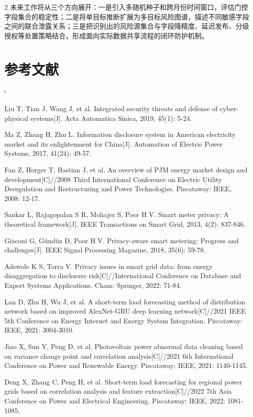 \documentclass[UTF8,zihao=5,twoside]{ctexart}
\makeatletter
\numberwithin{equation}{section}
\renewcommand{\refname}{参考文献}
\renewenvironment{thebibliography}[1]{%
  \section*{\refname}%
  \small
  \list{[\arabic{enumi}]}{%
    \settowidth\labelwidth{[#1]}%
    \leftmargin\labelwidth
    \advance\leftmargin\labelsep
    \usecounter{enumi}}
  \sloppy\clubpenalty4000\widowpenalty4000\sfcode`\.\@m
}{\def\@noitemerr{\@latex@warning{Empty `thebibliography' environment}}\endlist}
\makeatother
\begin{document}
\begin{multicols}{2}
未来工作将从三个方向展开：一是引入多随机种子和跨月份时间窗口，评估门控字段集合的稳定性；二是将单目标推断扩展为多目标风险图谱，描述不同敏感字段之间的联合泄露关系；三是把识别出的风险源集合与字段降精度、延迟发布、分级授权等处置策略结合，形成面向实际数据共享流程的闭环防护机制。

\balance
\begin{thebibliography}{99}
Liu T, Tian J, Wang J, et al. Integrated security threats and defense of cyber-physical systems[J]. Acta Automatica Sinica, 2019, 45(1): 5-24.

Ma Z, Zhang H, Zhu L. Information disclosure system in American electricity market and its enlightenment for China[J]. Automation of Electric Power Systems, 2017, 41(24): 49-57.

Fan Z, Horger T, Bastian J, et al. An overview of PJM energy market design and development[C]//2008 Third International Conference on Electric Utility Deregulation and Restructuring and Power Technologies. Piscataway: IEEE, 2008: 12-17.

Sankar L, Rajagopalan S R, Mohajer S, Poor H V. Smart meter privacy: A theoretical framework[J]. IEEE Transactions on Smart Grid, 2013, 4(2): 837-846.

Giaconi G, Gündüz D, Poor H V. Privacy-aware smart metering: Progress and challenges[J]. IEEE Signal Processing Magazine, 2018, 35(6): 59-78.

Adewole K S, Torra V. Privacy issues in smart grid data: from energy disaggregation to disclosure risk[C]//International Conference on Database and Expert Systems Applications. Cham: Springer, 2022: 71-84.

Lan D, Zhu H, Wu J, et al. A short-term load forecasting method of distribution network based on improved AlexNet-GRU deep learning network[C]//2021 IEEE 5th Conference on Energy Internet and Energy System Integration. Piscataway: IEEE, 2021: 3004-3010.

Jiao X, Sun Y, Peng D, et al. Photovoltaic power abnormal data cleaning based on variance change point and correlation analysis[C]//2021 6th International Conference on Power and Renewable Energy. Piscataway: IEEE, 2021: 1140-1145.

Deng X, Zhang C, Peng H, et al. Short-term load forecasting for regional power grids based on correlation analysis and feature extraction[C]//2022 7th Asia Conference on Power and Electrical Engineering. Piscataway: IEEE, 2022: 1081-1085.


\end{thebibliography}
\end{multicols}
\end{document}
